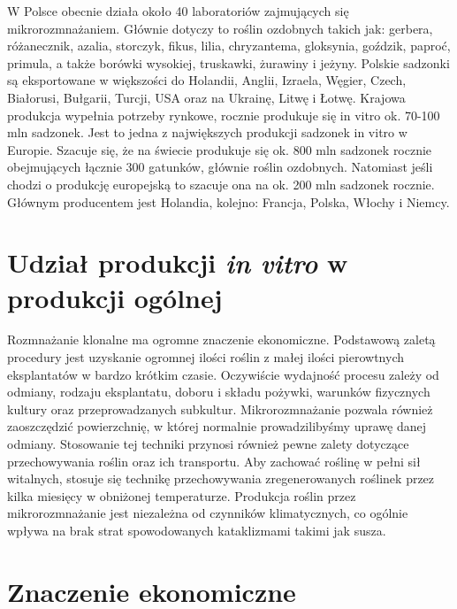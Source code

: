 \documentclass[two column, twoside, a4paper]{article}
\begin{document}
W Polsce obecnie działa około 40 laboratoriów zajmujących się mikrorozmnażaniem. Głównie dotyczy to roślin ozdobnych takich jak: gerbera, różanecznik, azalia, storczyk, fikus, lilia, chryzantema, gloksynia, goździk, paproć, primula, a także borówki wysokiej, truskawki, żurawiny i jeżyny. Polskie sadzonki są eksportowane w większości do Holandii, Anglii, Izraela, Węgier, Czech, Białorusi, Bułgarii, Turcji, USA oraz na Ukrainę, Litwę i Łotwę. Krajowa produkcja wypełnia potrzeby rynkowe, rocznie produkuje się in vitro ok. 70-100 mln sadzonek. Jest to jedna z największych produkcji sadzonek in vitro w Europie. Szacuje się, że na świecie produkuje się ok. 800 mln sadzonek rocznie obejmujących łącznie 300 gatunków, głównie roślin ozdobnych. Natomiast jeśli chodzi o produkcję europejską to szacuje ona na ok. 200 mln sadzonek rocznie. Głównym producentem jest Holandia, kolejno: Francja, Polska, Włochy i Niemcy.

\section{Udział produkcji \textit{in vitro} w produkcji ogólnej}

Rozmnażanie klonalne ma ogromne znaczenie ekonomiczne. Podstawową zaletą procedury jest uzyskanie ogromnej ilości roślin z małej ilości pierowtnych eksplantatów w bardzo krótkim czasie. Oczywiście wydajność procesu zależy od odmiany, rodzaju eksplantatu, doboru i składu pożywki, warunków fizycznych kultury oraz przeprowadzanych subkultur. Mikrorozmnażanie pozwala również zaoszczędzić powierzchnię, w której normalnie prowadzilibyśmy uprawę danej odmiany. Stosowanie tej techniki przynosi również pewne zalety dotyczące przechowywania roślin oraz ich transportu. Aby zachować roślinę w pełni sił witalnych, stosuje się technikę przechowywania zregenerowanych roślinek przez kilka miesięcy w obniżonej temperaturze.
Produkcja roślin przez mikrorozmnażanie jest niezależna od czynników klimatycznych, co ogólnie wpływa na brak strat spowodowanych kataklizmami takimi jak susza.

\section{Znaczenie ekonomiczne}
\end{document}
